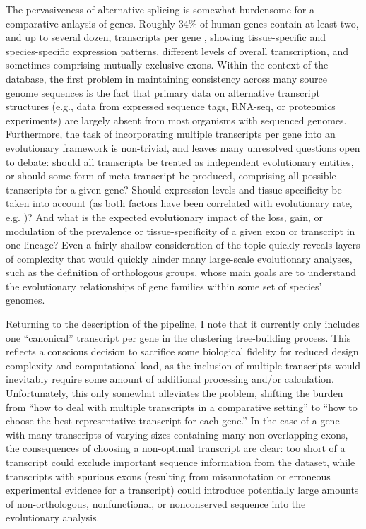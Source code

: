 The pervasiveness of
alternative splicing is somewhat burdensome for a comparative anlaysis of genes. Roughly 34\% of human
genes contain at least two, and up to several dozen, transcripts per
gene \citep{Mironov1999}, showing tissue-specific and species-specific
expression patterns, different levels of overall transcription, and
sometimes comprising mutually exclusive exons. Within the context of
the \cmp database, the first problem in maintaining consistency across
many source genome sequences is the fact that primary data on
alternative transcript structures (e.g., data from expressed sequence
tags, RNA-seq, or proteomics experiments) are largely absent from most
organisms with sequenced genomes. Furthermore, the task of
incorporating multiple transcripts per gene into an evolutionary
framework is non-trivial, and leaves many unresolved questions open to
debate: should all transcripts be treated as independent evolutionary
entities, or should some form of meta-transcript be produced,
comprising all possible transcripts for a given gene? Should
expression levels and tissue-specificity be taken into account (as
both factors have been correlated with evolutionary rate,
e.g. \citep{Koonin2006a,Zhu2008})? And what is the expected
evolutionary impact of the loss, gain, or modulation of the prevalence
or tissue-specificity of a given exon or transcript in one lineage?
Even a fairly shallow consideration of the topic quickly reveals
layers of complexity that would quickly hinder many large-scale
evolutionary analyses, such as the definition of orthologous groups,
whose main goals are to understand the evolutionary relationships of
gene families within some set of species' genomes.

Returning to the description of the \cmp pipeline, I note that it
currently only includes one ``canonical'' transcript per gene in the
clustering tree-building process. This reflects a conscious decision
to sacrifice some biological fidelity for reduced design complexity
and computational load, as the inclusion of multiple transcripts would
inevitably require some amount of additional processing and/or
calculation. Unfortunately, this only somewhat alleviates the problem,
shifting the burden from ``how to deal with multiple transcripts in a
comparative setting'' to ``how to choose the best representative
transcript for each gene.'' In the case of a gene with many
transcripts of varying sizes containing many non-overlapping exons,
the consequences of choosing a non-optimal transcript are clear: too
short of a transcript could exclude important sequence information
from the dataset, while transcripts with spurious exons (resulting
from misannotation or erroneous experimental evidence for a
transcript) could introduce potentially large amounts of
non-orthologous, nonfunctional, or nonconserved sequence into the
evolutionary analysis.

